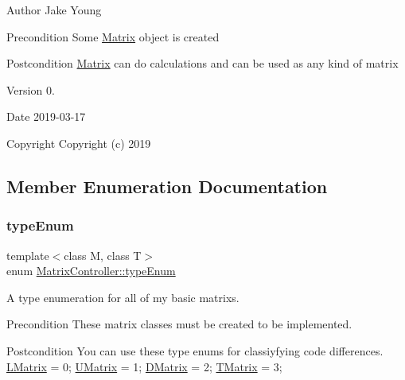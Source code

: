 \begin{DoxyAuthor}{Author}
Jake Young 
\end{DoxyAuthor}
\begin{DoxyPrecond}{Precondition}
Some \mbox{\hyperlink{class_matrix}{Matrix}} object is created 
\end{DoxyPrecond}
\begin{DoxyPostcond}{Postcondition}
\mbox{\hyperlink{class_matrix}{Matrix}} can do calculations and can be used as any kind of matrix 
\end{DoxyPostcond}
\begin{DoxyVersion}{Version}
0. 
\end{DoxyVersion}
\begin{DoxyDate}{Date}
2019-\/03-\/17
\end{DoxyDate}
\begin{DoxyCopyright}{Copyright}
Copyright (c) 2019 
\end{DoxyCopyright}


\subsection{Member Enumeration Documentation}
\mbox{\label{class_matrix_controller_aca66836084cbc7807dbaea879ac31fc7}} 
\subsubsection{\texorpdfstring{typeEnum}{typeEnum}}
{\footnotesize\ttfamily template$<$class M, class T$>$ \\
enum \mbox{\hyperlink{class_matrix_controller_aca66836084cbc7807dbaea879ac31fc7}{Matrix\+Controller\+::type\+Enum}}}



A type enumeration for all of my basic matrixs. 

\begin{DoxyPrecond}{Precondition}
These matrix classes must be created to be implemented. 
\end{DoxyPrecond}
\begin{DoxyPostcond}{Postcondition}
You can use these type enums for classiyfying code differences. \mbox{\hyperlink{class_l_matrix}{L\+Matrix}} = 0; \mbox{\hyperlink{class_u_matrix}{U\+Matrix}} = 1; \mbox{\hyperlink{class_d_matrix}{D\+Matrix}} = 2; \mbox{\hyperlink{class_t_matrix}{T\+Matrix}} = 3; 
\end{DoxyPostcond}


